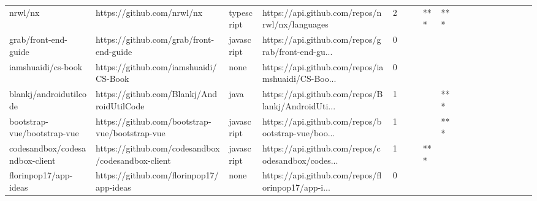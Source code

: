 \begin{tabular}{llllrlllllllllllll}
nrwl/nx                                            &                         https://github.com/nrwl/nx &        typescript &     https://api.github.com/repos/nrwl/nx/languages &       2 &         &        &       *** &            *** &                 &        &           &           &          &          &       &              &          \\
grab/front-end-guide                               &            https://github.com/grab/front-end-guide &        javascript &  https://api.github.com/repos/grab/front-end-gu... &       0 &         &        &           &                &                 &        &           &           &          &          &       &              &          \\
iamshuaidi/cs-book                                 &              https://github.com/iamshuaidi/CS-Book &              none &  https://api.github.com/repos/iamshuaidi/CS-Boo... &       0 &         &        &           &                &                 &        &           &           &          &          &       &              &          \\
blankj/androidutilcode                             &          https://github.com/Blankj/AndroidUtilCode &              java &  https://api.github.com/repos/Blankj/AndroidUti... &       1 &         &        &           &            *** &                 &        &           &           &          &          &       &              &          \\
bootstrap-vue/bootstrap-vue                        &     https://github.com/bootstrap-vue/bootstrap-vue &        javascript &  https://api.github.com/repos/bootstrap-vue/boo... &       1 &         &        &           &            *** &                 &        &           &           &          &          &       &              &          \\
codesandbox/codesandbox-client                     &  https://github.com/codesandbox/codesandbox-client &        javascript &  https://api.github.com/repos/codesandbox/codes... &       1 &         &        &       *** &                &                 &        &           &           &          &          &       &              &          \\
florinpop17/app-ideas                              &           https://github.com/florinpop17/app-ideas &              none &  https://api.github.com/repos/florinpop17/app-i... &       0 &         &        &           &                &                 &        &           &           &          &          &       &              &          \\

\end{tabular}
